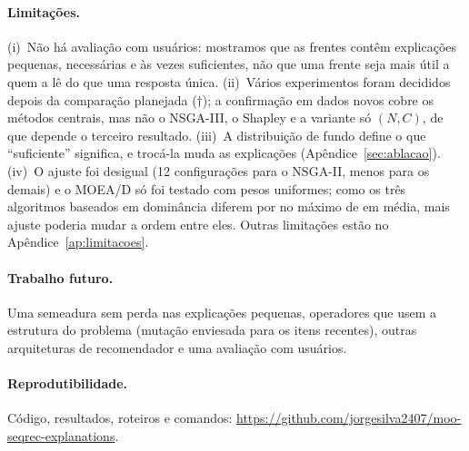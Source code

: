 \paragraph{Limitações.}
(i)~Não há avaliação com usuários: mostramos que as frentes contêm explicações
pequenas, necessárias e às vezes suficientes, não que uma frente seja mais útil
a quem a lê do que uma resposta única. (ii)~Vários experimentos foram decididos
depois da comparação planejada ($\dagger$); a confirmação em dados novos cobre
os métodos centrais, mas não o NSGA-III, o Shapley e a variante só $(N,C)$, de
que depende o terceiro resultado. (iii)~A distribuição de fundo define o que
``suficiente'' significa, e trocá-la muda as explicações
(Apêndice~\ref{sec:ablacao}). (iv)~O ajuste foi desigual (12 configurações
para o NSGA-II, menos para os demais) e o MOEA/D só foi testado com pesos
uniformes; como os três algoritmos baseados em dominância diferem por no
máximo  de \HVp{} em média, mais ajuste poderia mudar a
ordem entre eles. Outras
limitações estão no Apêndice~\ref{ap:limitacoes}.

\paragraph{Trabalho futuro.}
Uma semeadura sem perda nas explicações pequenas, operadores que usem a
estrutura do problema (mutação enviesada para os itens recentes), outras
arquiteturas de recomendador e uma avaliação com usuários.

\paragraph{Reprodutibilidade.}
Código, resultados, roteiros e comandos:
\url{https://github.com/jorgesilva2407/moo-seqrec-explanations}.
